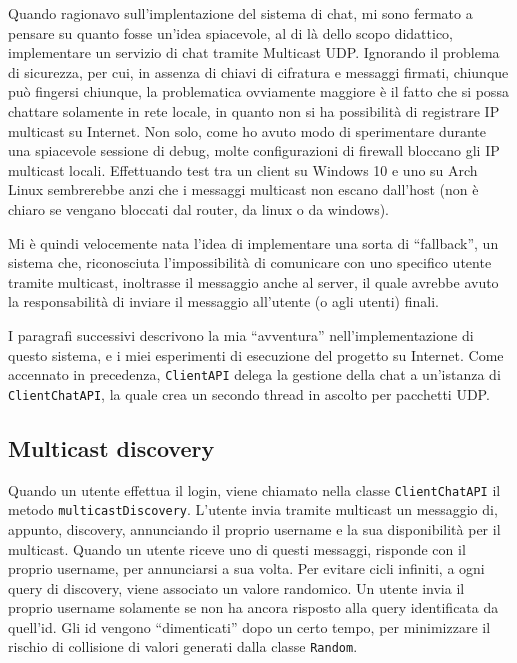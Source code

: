 \documentclass[a4paper,11pt] {article}
\begin{document}
Quando ragionavo sull'implentazione del sistema di chat, mi sono fermato a pensare su quanto fosse un'idea spiacevole, al di là dello scopo didattico, implementare un servizio di chat tramite Multicast UDP. Ignorando il problema di sicurezza, per cui, in assenza di chiavi di cifratura e messaggi firmati, chiunque può fingersi chiunque, la problematica ovviamente maggiore è il fatto che si possa chattare solamente in rete locale, in quanto non si ha possibilità di registrare IP multicast su Internet. Non solo, come ho avuto modo di sperimentare durante una spiacevole sessione di debug, molte configurazioni di firewall bloccano gli IP multicast locali.
Effettuando test tra un client su Windows 10 e uno su Arch Linux sembrerebbe anzi che i messaggi multicast non escano dall'host (non è chiaro se vengano bloccati dal router, da linux o da windows).

Mi è quindi velocemente nata l'idea di implementare una sorta di ``fallback'', un sistema che, riconosciuta l'impossibilità di comunicare con uno specifico utente tramite multicast, inoltrasse il messaggio anche al server, il quale avrebbe avuto la responsabilità di inviare il messaggio all'utente (o agli utenti) finali.

I paragrafi successivi descrivono la mia ``avventura'' nell'implementazione di questo sistema, e i miei esperimenti di esecuzione del progetto su Internet.
Come accennato in precedenza, \texttt{ClientAPI} delega la gestione della chat a un'istanza di \texttt{ClientChatAPI}, la quale crea un secondo thread in ascolto per pacchetti UDP.

\subsection*{Multicast discovery}

Quando un utente effettua il login, viene chiamato nella classe \texttt{ClientChatAPI} il metodo \linebreak\texttt{multicastDiscovery}. L'utente invia tramite multicast un messaggio di, appunto, discovery, annunciando il proprio username e la sua disponibilità per il multicast. Quando un utente riceve uno di questi messaggi, risponde con il proprio username, per annunciarsi a sua volta. Per evitare cicli infiniti, a ogni query di discovery, viene associato un valore randomico. Un utente invia il proprio username solamente se non ha ancora risposto alla query identificata da quell'id. Gli id vengono ``dimenticati'' dopo un certo tempo, per minimizzare il rischio di collisione di valori generati dalla classe \texttt{Random}.
\end{document}
